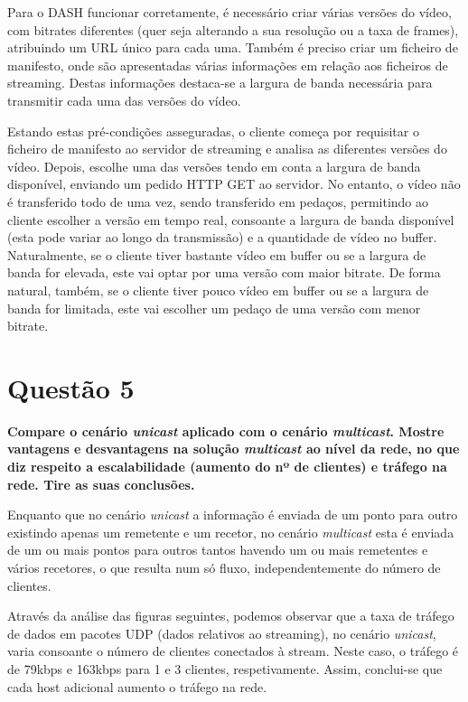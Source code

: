 \documentclass[a4paper, 11pt]{article}
\begin{document}
Para o DASH funcionar corretamente, é necessário criar várias versões do vídeo, com bitrates diferentes (quer seja alterando a sua resolução ou a taxa de frames), atribuindo um URL único para cada uma. Também é preciso criar um ficheiro de manifesto, onde são apresentadas várias informações em relação aos ficheiros de streaming. Destas informações destaca-se a largura de banda necessária para transmitir cada uma das versões do vídeo.

Estando estas pré-condições asseguradas, o cliente começa por requisitar o ficheiro de manifesto ao servidor de streaming e analisa as diferentes versões do vídeo. Depois, escolhe uma das versões tendo em conta a largura de banda disponível, enviando um pedido HTTP GET ao servidor. No entanto, o vídeo não é transferido todo de uma vez, sendo transferido em pedaços, permitindo ao cliente escolher a versão em tempo real, consoante a largura de banda disponível (esta pode variar ao longo da transmissão) e a quantidade de vídeo no buffer. Naturalmente, se o cliente tiver bastante vídeo em buffer ou se a largura de banda for elevada, este vai optar por uma versão com maior bitrate. De forma natural, também, se o cliente tiver pouco vídeo em buffer ou se a largura de banda for limitada, este vai escolher um pedaço de uma versão com menor bitrate. \cite{livro}


\section{Questão 5}
\textbf{Compare o cenário \textit{unicast} aplicado com o cenário \textit{multicast}. Mostre vantagens e desvantagens na solução \textit{multicast} ao nível da rede, no que diz respeito a escalabilidade (aumento do nº de clientes) e tráfego na rede. Tire as suas conclusões.}
\vspace{0.25cm}

Enquanto que no cenário \textit{unicast} a informação é enviada de um ponto para outro existindo apenas um remetente e um recetor, no cenário \textit{multicast} esta é enviada de um ou mais pontos para outros tantos havendo um ou mais remetentes e vários recetores, o que resulta num só fluxo, independentemente do número de clientes. \cite{q5}

Através da análise das figuras seguintes, podemos observar que a taxa de tráfego de dados em pacotes UDP (dados relativos ao streaming), no cenário \textit{unicast}, varia consoante o número de clientes conectados à stream. Neste caso, o tráfego é de 79kbps e 163kbps para 1 e 3 clientes, respetivamente. Assim, conclui-se que cada host adicional aumento o tráfego na rede.
\end{document}
